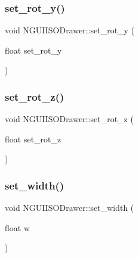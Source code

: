 \hypertarget{class_n_g_u_i_i_s_o_drawer_adff126c5e57d89d9e9255a011b2c7d8c}{}\label{class_n_g_u_i_i_s_o_drawer_adff126c5e57d89d9e9255a011b2c7d8c} 
\subsubsection{\texorpdfstring{set\+\_\+rot\+\_\+y()}{set\_rot\_y()}}
{\footnotesize\ttfamily void N\+G\+U\+I\+I\+S\+O\+Drawer\+::set\+\_\+rot\+\_\+y (\begin{DoxyParamCaption}\item[{float}]{set\+\_\+rot\+\_\+y }\end{DoxyParamCaption})}

\hypertarget{class_n_g_u_i_i_s_o_drawer_a499b9a1d83db6e1c476881f68667bea8}{}\label{class_n_g_u_i_i_s_o_drawer_a499b9a1d83db6e1c476881f68667bea8} 
\subsubsection{\texorpdfstring{set\+\_\+rot\+\_\+z()}{set\_rot\_z()}}
{\footnotesize\ttfamily void N\+G\+U\+I\+I\+S\+O\+Drawer\+::set\+\_\+rot\+\_\+z (\begin{DoxyParamCaption}\item[{float}]{set\+\_\+rot\+\_\+z }\end{DoxyParamCaption})}

\hypertarget{class_n_g_u_i_i_s_o_drawer_a027fe95837018a59f6ac42a5630d5c9f}{}\label{class_n_g_u_i_i_s_o_drawer_a027fe95837018a59f6ac42a5630d5c9f} 
\subsubsection{\texorpdfstring{set\+\_\+width()}{set\_width()}}
{\footnotesize\ttfamily void N\+G\+U\+I\+I\+S\+O\+Drawer\+::set\+\_\+width (\begin{DoxyParamCaption}\item[{float}]{w }\end{DoxyParamCaption})}

